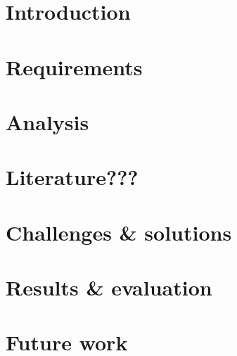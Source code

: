 \documentclass[a4paper,10pt]{article}
\begin{document}

\tableofcontents


\section{Introduction}
\label{sec:introduction}


\section{Requirements}
\label{sec:description}


\section{Analysis}
\label{sec:analysis}


\section{Literature???}
\label{sec:literature}


\section{Challenges \& solutions}
\label{sec:challenges}


\section{Results \& evaluation}
\label{sec:results}


\section{Future work}
\label{sec:future-work}

\end{document}
